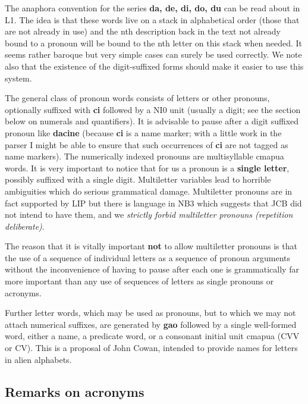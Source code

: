 \documentclass[12pt]{book}
\begin{document}
The anaphora convention for the series {\bf da, de, di, do, du} can be read about in L1.  The idea is that these words live on a stack in alphabetical order (those that are not already in use) and the nth description back in the text not already bound to a pronoun will be bound to the nth letter on this stack when needed.   It seems rather baroque but very simple cases can surely be used correctly.  We note also that the existence of the digit-suffixed forms should make it easier to use this system.

The general class of pronoun words consists of letters or other pronouns, optionally suffixed with {\bf ci} followed by a NI0 unit (usually a digit; see the section below on numerals and quantifiers).   It is advisable to pause after a digit suffixed pronoun like {\bf dacine} (because {\bf ci} is a name marker; with a little work in the parser I might be able to ensure that such occurrences of {\bf ci} are not tagged as name markers).   The numerically indexed pronouns are multisyllable cmapua words.  It is very important
to notice that for us a pronoun is a {\bf single letter}, possibly suffixed with a single digit.  Multiletter variables lead to horrible ambiguities which do serious grammatical damage.
Multiletter pronouns are in fact supported by LIP but there is language in NB3 which suggests that JCB did not intend to have them, and we {\em strictly forbid multiletter pronouns (repetition deliberate)}.

The reason that it is vitally important {\bf not} to allow multiletter pronouns is that the use of a sequence of individual letters as a sequence of pronoun arguments without the inconvenience of having to pause after each one is grammatically far more important than any use of sequences of letters as single pronouns or acronyms.

Further letter words, which may be used as pronouns, but to which we may not attach numerical suffixes, are generated by {\bf gao} followed by a single well-formed word, either a name, a predicate word, or a consonant initial unit cmapua (CVV or CV).
This is a proposal of John Cowan, intended to provide names for letters in alien alphabets.



\subsection{Remarks on acronyms}
\end{document}
